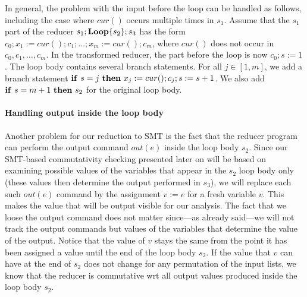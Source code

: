 \documentclass{llncs}
\newcommand{\cur}{cur()}
\newcommand{\IF}[2]{
	\ifmmode
	\mathbf{if}\ #1 \ \mathbf{then}\ #2
	\else
	\textbf{if}\ #1 \ \textbf{then}\ #2
	\fi}
\newcommand{\rloop}{
	\ifmmode
	\mathbf{Loop}
	\else
	\textbf{Loop}
	\fi}
\begin{document}
%			

In general, the problem with the input before the loop can be handled as follows,
including the case where $\cur$ occurs multiple times in $s_1$. Assume that the
$s_1$ part of the reducer $s_1;\rloop\{s_2\};s_3$ has the form
$c_0;x_{1}{:=} \cur;c_1; \ldots; x_{m}{:=}\cur;c_m$, where $\cur$ does
not occur in $c_0,c_1,\ldots, c_m$. 
In the transformed reducer, the part before the loop is now $c_0;s:=1$. The loop body contains several branch statements. 
For all $j \in [1,m]$, we add a branch statement $\IF{s=j}{x_{j}:=\cur; c_j; s:=s+1}$. 
We also add $\IF{s=m+1}{s_2}$ for the original loop body.

\paragraph*{Handling output inside the loop body} 

Another problem for our reduction to SMT is the fact that the reducer program
can perform the output command $out(e)$ inside the loop body $s_2$. Since our
SMT-based commutativity checking presented later on will be based on examining
possible values of the variables that appear in the $s_2$ loop body only (these
values then determine the output performed in $s_3$), we will replace each such
$out(e)$ command by the assignment $v:=e$ for a fresh variable $v$. This makes
the value that will be output visible for our analysis. The fact that we loose
the output command does not matter since---as already said---we will not track
the output commands but values of the variables that determine the value of the
output.  Notice that the value of $v$ stays the same from the point it has been
assigned a value until the end of the loop body $s_2$. If the value that $v$ can
have at the end of $s_2$ does not change for any permutation of the input lists,
we know that the reducer is commutative wrt all output values produced inside
the loop body $s_2$.
\end{document}
